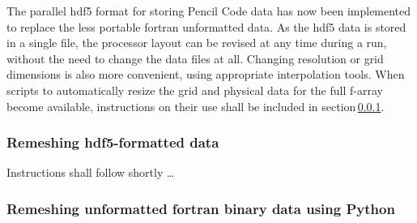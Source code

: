 \documentclass[\mydriver,12pt,twoside,notitlepage,a4paper]{article}
\begin{document}
The parallel hdf5 format for storing Pencil Code data has now been implemented
to replace the less portable fortran unformatted data.
As the hdf5 data is stored in a single file, the processor layout can be
revised at any time during a run, without the need to change the data files at
all.
Changing resolution or grid dimensions is also more convenient, using
appropriate interpolation tools.
When scripts to automatically resize the grid and physical data for the full
f-array become available, instructions on their use 
shall be included in section\,\ref{h5-remesh}.

\subsubsection{Remeshing hdf5-formatted data}
\label{h5-remesh}
Instructions shall follow shortly \ldots

\subsubsection{Remeshing unformatted fortran binary data using Python}
\label{python-remesh}
\end{document}
